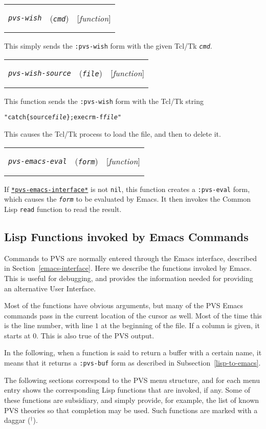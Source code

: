 \documentclass[12pt]{book}
\makeatletter
\newenvironment{function}[3]%
{\par\noindent\begin{boxedminipage}{\textwidth}%
 \par\noindent\begin{tabularx}{\linewidth}{l>{\raggedright}Xr}%
 \functionhtgt{#1}&(\texttt{\textit{#2}})&[\emph{#3}]%
 \end{tabularx}\par\flushright\begin{minipage}{.97\textwidth}}
{\end{minipage}\end{boxedminipage}}
\newcommand{\functionnm}[1]{\texttt{\textit{#1}}}
\newcommand{\functionhtgt}[1]{\hypertarget{#1}{\functionnm{#1}}\index{#1@\functionnm{#1}|underline}}
\newenvironment{lispfunction}[2]%
{\begin{function}{#1}{#2}{function}}{\end{function}}
\newcommand{\globalnm}[1]{\texttt{\textup{#1}}}
\newcommand{\globalhln}[1]{\hyperlink{#1}{\globalnm{#1}}}
\makeatother
\begin{document}
\begin{lispfunction}{pvs-wish}{cmd}
This simply sends the \texttt{:pvs-wish} form with the given Tcl/Tk
\functionnm{cmd}.
\end{lispfunction}

\begin{lispfunction}{pvs-wish-source}{file}
This function sends the \texttt{:pvs-wish} form with the Tcl/Tk string
\begin{alltt}
  "catch \{source \functionnm{file}\}; exec rm -f \functionnm{file}"
\end{alltt}
This causes the Tcl/Tk process to load the file, and then to delete it.
\end{lispfunction}

\begin{lispfunction}{pvs-emacs-eval}{form}
If \globalhln{*pvs-emacs-interface*} is not \texttt{nil}, this function
creates a \texttt{:pvs-eval} form, which causes the \functionnm{form} to
be evaluated by Emacs.  It then invokes the Common Lisp \texttt{read}
function to read the result.
\end{lispfunction}


\subsection{Lisp Functions invoked by Emacs Commands}

Commands to PVS are normally entered through the Emacs interface,
described in Section~\ref{emacs-interface}.  Here we describe the
functions invoked by Emacs.  This is useful for debugging, and provides
the information needed for providing an alternative User Interface.

Most of the functions have obvious arguments, but many of the PVS Emacs
commands pass in the current location of the cursor as well.  Most of the
time this is the line number, with line $1$ at the beginning of the file.
If a column is given, it starts at $0$.  This is also true of the PVS
output.

In the following, when a function is said to return a buffer with a
certain name, it means that it returns a \texttt{:pvs-buf} form as
described in Subsection~\ref{lisp-to-emacs}.

The following sections correspond to the PVS menu structure, and for each
menu entry shows the corresponding Lisp functions that are invoked, if
any.  Some of these functions are subsidiary, and simply provide, for
example, the list of known PVS theories so that completion may be used.
Such functions are marked with a daggar ($^\dagger$).
\end{document}
